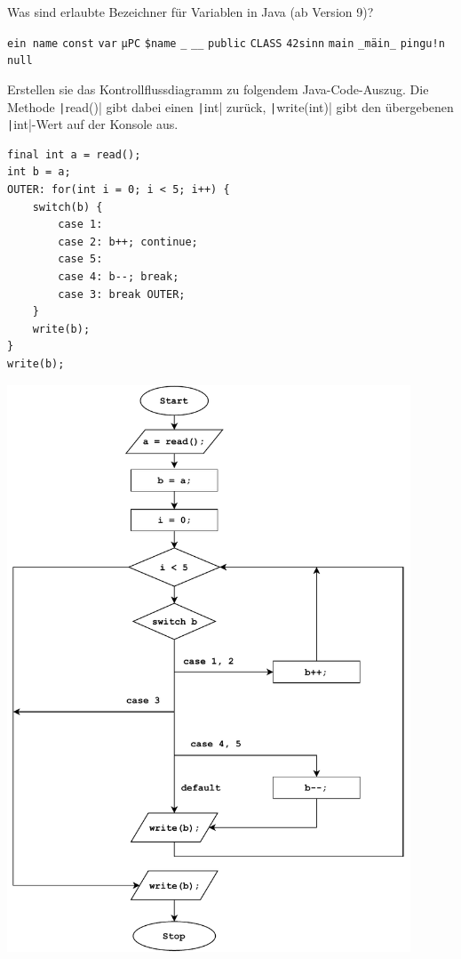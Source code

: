 \documentclass[11pt]{exam} %
\newcommand{\code}[1]{\texttt|#1|}
\newcommand{\fillinline}[1]{\fillin[\code{#1}][3cm]\xrfill[-1pt]{0.2mm}}
\begin{document}
\begin{questions}
\question Was sind erlaubte Bezeichner für Variablen in Java (ab Version 9)?
\begin{checkboxes}
\choice \texttt{ein name}
\CorrectChoice \texttt{const}
\CorrectChoice \texttt{var}
\CorrectChoice \texttt{µPC}
\CorrectChoice \texttt{\$name}
\choice \texttt{\_}
\CorrectChoice \texttt{\_\_}
\choice \texttt{public}
\CorrectChoice \texttt{CLASS}
\choice \texttt{42sinn}
\CorrectChoice \texttt{main}
\CorrectChoice \texttt{\_mäin\_}
\choice \texttt{pingu!n}
\choice \texttt{null}
\end{checkboxes}
\question Erstellen sie das Kontrollflussdiagramm zu folgendem Java-Code-Auszug. Die Methode \code{read()} gibt dabei einen \code{int} zurück, \code{write(int)} gibt den übergebenen \code{int}-Wert auf der Konsole aus.
\begin{verbatim}
final int a = read();
int b = a;
OUTER: for(int i = 0; i < 5; i++) {
	switch(b) {
		case 1:
		case 2: b++; continue;
		case 5:
		case 4: b--; break;
		case 3: break OUTER;
	}
	write(b);
}
write(b);
\end{verbatim}
\begin{solution}
\includegraphics[width=12cm]{kontrollfluss.pdf}
\end{solution}

\end{questions}
\end{document}
